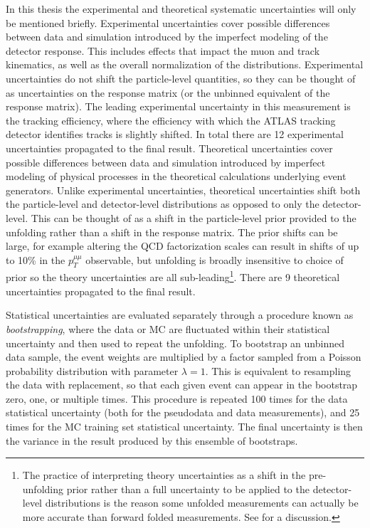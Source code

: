 In this thesis the experimental and theoretical systematic uncertainties will only be mentioned briefly.
Experimental uncertainties cover possible differences between data and simulation introduced by the imperfect modeling of the detector response.
This includes effects that impact the muon and track kinematics, as well as the overall normalization of the distributions.
Experimental uncertainties do not shift the particle-level quantities, so they can be thought of as uncertainties on the response matrix (or the unbinned equivalent of the response matrix).
The leading experimental uncertainty in this measurement is the tracking efficiency, where the efficiency with which the ATLAS tracking detector identifies tracks is slightly shifted.
In total there are 12 experimental uncertainties propagated to the final result.
Theoretical uncertainties cover possible differences between data and simulation introduced by imperfect modeling of physical processes in the theoretical calculations underlying event generators.
Unlike experimental uncertainties, theoretical uncertainties shift both the particle-level and detector-level distributions as opposed to only the detector-level.
This can be thought of as a shift in the particle-level prior provided to the unfolding rather than a shift in the response matrix.
The prior shifts can be large, for example altering the QCD factorization scales can result in shifts of up to 10\% in the $p_T^{\mu\mu}$ observable, but unfolding is broadly insensitive to choice of prior so the theory uncertainties are all sub-leading\footnote{The practice of interpreting theory uncertainties as a shift in the pre-unfolding prior rather than a full uncertainty to be applied to the detector-level distributions is the reason some unfolded measurements can actually be more accurate than forward folded measurements. See  for a discussion.}.
There are 9 theoretical uncertainties propagated to the final result.

Statistical uncertainties are evaluated separately through a procedure known as \textit{bootstrapping}, where the data or MC are fluctuated within their statistical uncertainty and then used to repeat the unfolding.
To bootstrap an unbinned data sample, the event weights are multiplied by a factor sampled from a Poisson probability distribution with parameter $\lambda = 1$.
This is equivalent to resampling the data with replacement, so that each given event can appear in the bootstrap zero, one, or multiple times.
This procedure is repeated 100 times for the data statistical uncertainty (both for the pseudodata and data measurements), and 25 times for the MC training set statistical uncertainty.
The final uncertainty is then the variance in the result produced by this ensemble of bootstraps.

